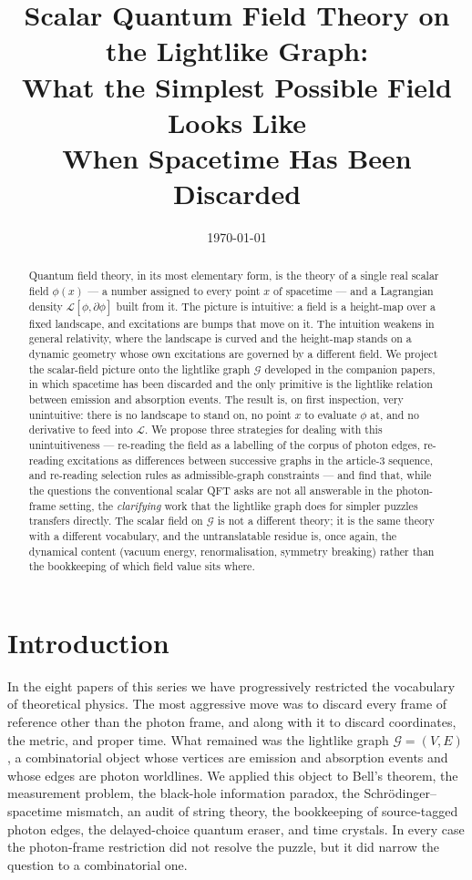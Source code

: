 \documentclass[11pt]{article}
\title{Scalar Quantum Field Theory on the Lightlike Graph:\\
What the Simplest Possible Field Looks Like\\
When Spacetime Has Been Discarded}
\date{\today}
\begin{document}
\maketitle

\begin{abstract}
Quantum field theory, in its most elementary form, is the theory of a single real scalar field $\phi(x)$ --- a number assigned to every point $x$ of spacetime --- and a Lagrangian density $\mathcal{L}[\phi, \partial\phi]$ built from it. The picture is intuitive: a field is a height-map over a fixed landscape, and excitations are bumps that move on it. The intuition weakens in general relativity, where the landscape is curved and the height-map stands on a dynamic geometry whose own excitations are governed by a different field. We project the scalar-field picture onto the lightlike graph $\mathcal{G}$ developed in the companion papers, in which spacetime has been discarded and the only primitive is the lightlike relation between emission and absorption events. The result is, on first inspection, very unintuitive: there is no landscape to stand on, no point $x$ to evaluate $\phi$ at, and no derivative to feed into $\mathcal{L}$. We propose three strategies for dealing with this unintuitiveness --- re-reading the field as a labelling of the corpus of photon edges, re-reading excitations as differences between successive graphs in the article-3 sequence, and re-reading selection rules as admissible-graph constraints --- and find that, while the questions the conventional scalar QFT asks are not all answerable in the photon-frame setting, the \emph{clarifying} work that the lightlike graph does for simpler puzzles transfers directly. The scalar field on $\mathcal{G}$ is not a different theory; it is the same theory with a different vocabulary, and the untranslatable residue is, once again, the dynamical content (vacuum energy, renormalisation, symmetry breaking) rather than the bookkeeping of which field value sits where.
\end{abstract}

\section{Introduction}
\label{sec:intro}

In the eight papers of this series we have progressively restricted the vocabulary of theoretical physics. The most aggressive move was to discard every frame of reference other than the photon frame, and along with it to discard coordinates, the metric, and proper time. What remained was the lightlike graph $\mathcal{G} = (V, E)$, a combinatorial object whose vertices are emission and absorption events and whose edges are photon worldlines. We applied this object to Bell's theorem, the measurement problem, the black-hole information paradox, the Schr\"odinger--spacetime mismatch, an audit of string theory, the bookkeeping of source-tagged photon edges, the delayed-choice quantum eraser, and time crystals. In every case the photon-frame restriction did not resolve the puzzle, but it did narrow the question to a combinatorial one.
\end{document}
